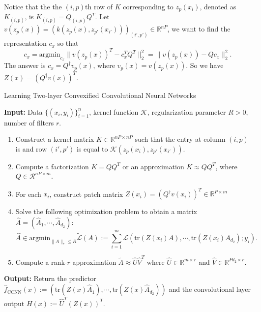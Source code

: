 \documentclass{article}
\renewcommand{\algorithmicrequire}{\textbf{Input:}}
\renewcommand{\algorithmicensure}{\textbf{Output:}}
\begin{document}
Notice that the the $(i,p)$th row of $K$ corresponding to $z_p(x_i)$, denoted as $K_{(i,p)}$, is $K_{(i,p)}=Q_{(i,p)}Q^T$. Let $v(z_p(x))=(k(z_p(x),z_{p'}(x_{i'})))_{(i',p')}\in\mathbb{R}^{nP}$, we want to find the representation $c_x$ so that
\[c_x=\text{argmin}_{c_x}\|v(z_p(x))^T-c_x^TQ^T\|_2^2=\|v(z_p(x))-Qc_x\|_2^2.\]
The answer is $c_x=Q^\dagger v_p(x)$, where $v_p(x)=v(z_p(x))$. So we have $Z(x)=(Q^\dagger v(x))^T$.



\begin{algorithm}
\caption{Learning Two-layer Convexified Convolutional Neural Networks}\label{euclid}
\algorithmicrequire{ Data $\lbrace(x_i,y_i)\rbrace_{i=1}^n$, kernel function $\mathcal{K	}$, regularization parameter $R>0$, number of filters $r$.}
\begin{enumerate}
\item Construct a kernel matrix $K\in\mathbb{R}^{nP\times nP}$ such that the entry at column $(i,p)$ is and row $(i',p')$ is equal to $\mathcal{K}(z_p(x_i),z_{p'}(x_{i'}))$.
\item Compute a factorization $K=QQ^T$ or an approximation  $K\approx QQ^T$, where $Q\in\mathcal{R}^{nP\times m}$.
\item For each $x_i$, construct patch matrix $Z(x_i)=(Q^\dagger v(x_i))^T\in\mathbb{R}^{P\times m}$
\item Solve the following optimization problem to obtain a matrix $\widehat{A}=(\widehat{A}_1,\cdots,\widehat{A}_{d_2})$:
\[\widehat{A}\in\text{argmin}_{\|A\|_*\leq R}\tilde{\mathcal{L}}(A):=\sum_{i=1}^m\mathcal{L}(\text{tr}(Z(x_i)A),\cdots,\text{tr}(Z(x_i)A_{d_2});y_i).\]
\item Compute a rank-$r$ approximation $\tilde{A}\approx\widehat{U}\widehat{V}^T$ where $\widehat{U}\in\mathbb{R}^{m\times r}$ and $\widehat{V}\in\mathbb{R}^{Pd_2\times r}$.
\end{enumerate}
\algorithmicensure{ Return the predictor $\widehat{f}_{\text{CCNN}}(x):=(\text{tr}(Z(x)\widehat{A}_1),\cdots,\text{tr}(Z(x)\widehat{A}_{d_2}))$ and the convolutional layer output $H(x):=\widehat{U}^T(Z(x))^T$.}
\end{algorithm}



\end{document}
